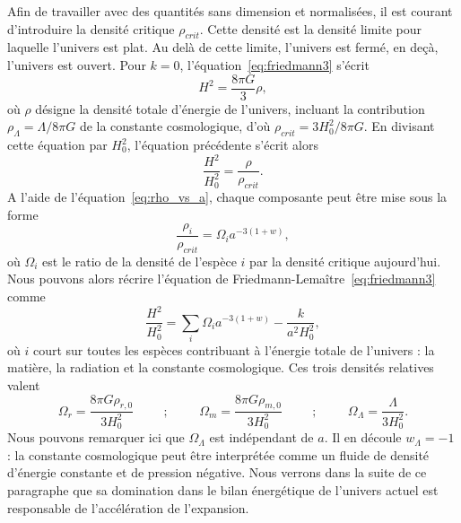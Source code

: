 \documentclass[11pt, twoside, a4paper, openright]{report}
\begin{document}
Afin de travailler avec des quantités sans dimension et normalisées, il est courant d'introduire la densité critique $\rho_{crit}$. Cette densité est la densité limite pour laquelle l'univers est plat. Au delà de cette limite, l'univers est fermé, en deçà, l'univers est ouvert. Pour $k = 0$, l'équation~\ref{eq:friedmann3} s'écrit
\begin{equation}
  H^{2} = \frac{8 \pi G }{3} \rho ,
\end{equation}
où $\rho$ désigne la densité totale d'énergie de l'univers, incluant la contribution $\rho_{\Lambda} = \Lambda / 8 \pi G$ de la constante cosmologique, d'où $\rho_{crit} = 3 H_0^2 / 8 \pi G$. En divisant cette équation par $H_{0}^{2}$, l'équation précédente s'écrit alors
\begin{equation}
  \label{eq:friedmann5}
  \frac{H^2}{H_0^2} = \frac{\rho}{\rho_{crit}} .
\end{equation}
A l'aide de l'équation~\ref{eq:rho_vs_a}, chaque composante peut être mise sous la forme
\begin{equation}
  \label{eq:def_omgega}
  \frac{\rho_i}{\rho_{crit}} = \Omega_i a^{-3 (1+w)} , 
\end{equation}
où $\Omega_i$ est le ratio de la densité de l'espèce $i$ par la densité critique aujourd'hui. Nous pouvons alors récrire l'équation de Friedmann-Lemaître~\ref{eq:friedmann3} comme
\begin{equation}
  \label{eq:friedmann6}
  \frac{H^2}{H_0^2} = \sum_i \Omega_i a^{-3 (1+w)} - \frac{k}{a^{2} H_{0}^{2}},
\end{equation}
où $i$ court sur toutes les espèces contribuant à l'énergie totale de l'univers : la matière, la radiation et la constante cosmologique. Ces trois densités relatives valent
\begin{equation}
  \label{eq:def_omega2}
\Omega_{r} = \frac{8 \pi G \rho_{r, 0}}{3 H_{0}^{2}} \hspace{1cm} ; \hspace{1cm} \Omega_{m} = \frac{8 \pi G \rho_{m, 0}}{3 H_{0}^{2}} \hspace{1cm} ;\hspace{1cm} \Omega_{\Lambda} = \frac{\Lambda}{3 H_{0}^{2}} .
\end{equation}
Nous pouvons remarquer ici que $\Omega_{\Lambda}$ est indépendant de $a$. Il en découle $w_{\Lambda} = -1$ : la constante cosmologique peut être interprétée comme un fluide de densité d'énergie constante et de pression négative. Nous verrons dans la suite de ce paragraphe que sa domination dans le bilan énergétique de l'univers actuel est responsable de l'accélération de l'expansion.
\end{document}
